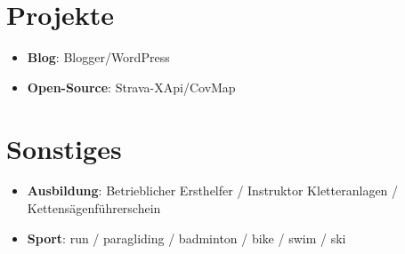 \documentclass[a4paper,11pt]{article}
\newcommand{\resumeItem}[2]{
  \item\small{
    \textbf{#1}{: #2 \vspace{-2pt}}
  }
}
\newcommand{\resumeSubItem}[2]{\resumeItem{#1}{#2}\vspace{-4pt}}
\newcommand{\resumeSubHeadingListStart}{\begin{itemize}[leftmargin=*]}
\newcommand{\resumeSubHeadingListEnd}{\end{itemize}}
\begin{document}
\section{Projekte}
  \resumeSubHeadingListStart
    \resumeSubItem{Blog}
      {Blogger/WordPress}
    \resumeSubItem{Open-Source}
      {Strava-XApi/CovMap}
  \resumeSubHeadingListEnd
\section{Sonstiges}
  \resumeSubHeadingListStart
    \resumeSubItem{Ausbildung}
      {Betrieblicher Ersthelfer / Instruktor Kletteranlagen / Kettensägenführerschein}
    \resumeSubItem{Sport}
      {run / paragliding / badminton / bike / swim / ski}
  \resumeSubHeadingListEnd

%
\end{document}

